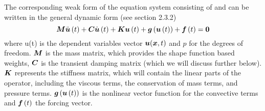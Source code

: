 The corresponding weak form of the equation system consisting of  and  can be written in the general dynamic form (see section 2.3.2)
\begin{equation}
  \matr{M}\fnof{\ddot{\vectr{u}}}{t}+\matr{C}\fnof{\dot{\vectr{u}}}{t}+\matr{K}\fnof{\vectr{u}}{t}+
  \fnof{\vectr{g}}{\fnof{\vectr{u}}{t}}+\fnof{\vectr{f}}{t}=\vectr{0}
  \label{eqn:generaldynamicnonlinear}
\end{equation}
where u(t) is the dependent variables vector $\boldsymbol{u}(\boldsymbol{x},t)$ and $p$ for the degrees of freedom. $\matr{M}$ is the mass matrix, which provides the shape function based weights, $\matr{C}$ is the transient damping matrix (which we will discuss further below). $\matr{K}$ represents the stiffness matrix, which will contain the linear parts of the operator, including the viscous terms, the conservation of mass terms, and pressure terms. $ \boldsymbol{g}\left(  \boldsymbol{u}\left( t \right)  \right) $ is the nonlinear vector function for the convective terms and $ \boldsymbol{f}\left( t \right) $ the forcing vector. 

